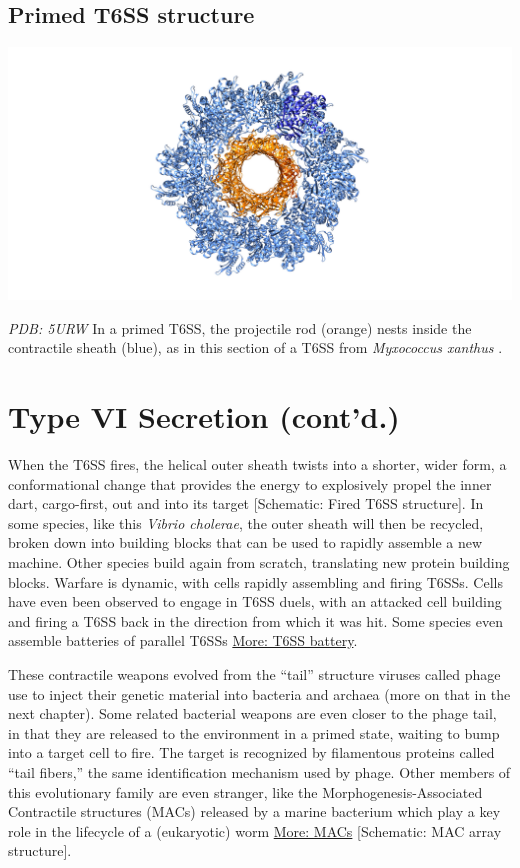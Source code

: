 \documentclass[]{tufte-book}
\begin{document}
\subsection{Primed T6SS structure}\label{Primed_T6SS_structure}

\includegraphics{img/schematics/9_6_1}

\emph{PDB: 5URW} In a primed T6SS, the projectile rod (orange) nests
inside the contractile sheath (blue), as in this section of a T6SS from
\emph{Myxococcus xanthus} \citep{chang2017}.

\section{Type VI Secretion (cont'd.)}\label{type-vi-secretion-contd.}

When the T6SS fires, the helical outer sheath twists into a shorter,
wider form, a conformational change that provides the energy to
explosively propel the inner dart, cargo-first, out and into its target
{[}Schematic: Fired T6SS structure{]}. In some species, like this
\emph{Vibrio cholerae}, the outer sheath will then be recycled, broken
down into building blocks that can be used to rapidly assemble a new
machine. Other species build again from scratch, translating new protein
building blocks. Warfare is dynamic, with cells rapidly assembling and
firing T6SSs. Cells have even been observed to engage in T6SS duels,
with an attacked cell building and firing a T6SS back in the direction
from which it was hit. Some species even assemble batteries of parallel
T6SSs \protect\hyperlink{T6SS_battery}{More: T6SS battery}.

These contractile weapons evolved from the ``tail'' structure viruses
called phage use to inject their genetic material into bacteria and
archaea (more on that in the next chapter). Some related bacterial
weapons are even closer to the phage tail, in that they are released to
the environment in a primed state, waiting to bump into a target cell to
fire. The target is recognized by filamentous proteins called ``tail
fibers,'' the same identification mechanism used by phage. Other members
of this evolutionary family are even stranger, like the
Morphogenesis-Associated Contractile structures (MACs) released by a
marine bacterium which play a key role in the lifecycle of a
(eukaryotic) worm \protect\hyperlink{MACs}{More: MACs} {[}Schematic: MAC
array structure{]}.
\end{document}
